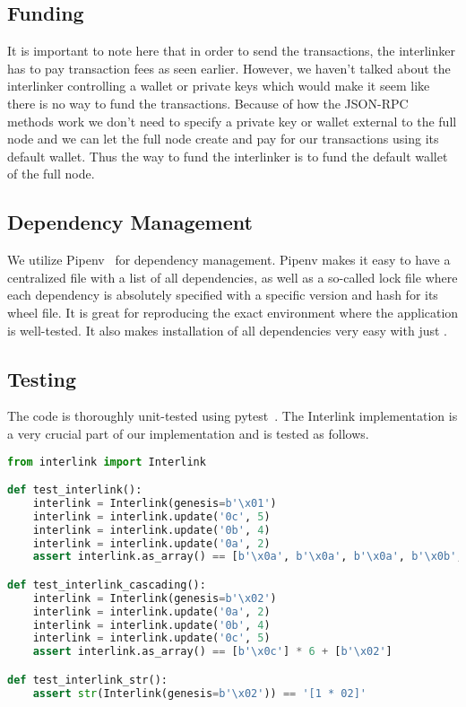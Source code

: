 \subsection{Funding}

It is important to note here that in order to send the transactions, the interlinker has to pay transaction fees as seen earlier. However, we haven't talked about the interlinker controlling a wallet or private keys which would make it seem like there is no way to fund the transactions. Because of how the JSON-RPC methods work we don't need to specify a private key or wallet external to the full node and we can let the full node create and pay for our transactions using its default wallet. Thus the way to fund the interlinker is to fund the default wallet of the full node.

\subsection{Dependency Management}

We utilize Pipenv~\cite{pipenv} for dependency management. Pipenv makes it easy to have a centralized file with a list of all dependencies, as well as a so-called lock file where each dependency is absolutely specified with a specific version and hash for its wheel file. It is great for reproducing the exact environment where the application is well-tested. It also makes installation of all dependencies very easy with just .

\subsection{Testing}

The code is thoroughly unit-tested using pytest~\cite{pytest}. The Interlink implementation is a very crucial part of our implementation and is tested as follows.

\begin{lstlisting}[language=Python]
from interlink import Interlink

def test_interlink():
    interlink = Interlink(genesis=b'\x01')
    interlink = interlink.update('0c', 5)
    interlink = interlink.update('0b', 4)
    interlink = interlink.update('0a', 2)
    assert interlink.as_array() == [b'\x0a', b'\x0a', b'\x0a', b'\x0b', b'\x0b', b'\x0c', b'\x01']

def test_interlink_cascading():
    interlink = Interlink(genesis=b'\x02')
    interlink = interlink.update('0a', 2)
    interlink = interlink.update('0b', 4)
    interlink = interlink.update('0c', 5)
    assert interlink.as_array() == [b'\x0c'] * 6 + [b'\x02']

def test_interlink_str():
    assert str(Interlink(genesis=b'\x02')) == '[1 * 02]'
\end{lstlisting}

